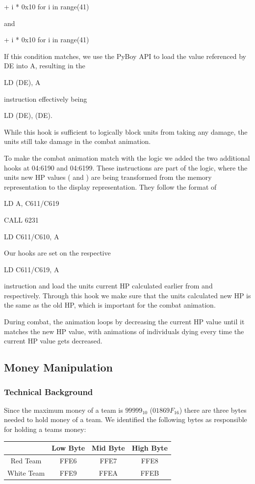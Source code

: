   + i *  0x10 for i in range(41)
 
 and

  + i *  0x10 for i in range(41)
 
If this condition matches, we use the PyBoy API to load the value referenced by DE into A, resulting in the

LD (DE), A

instruction effectively being 

LD (DE), (DE).

While this hook is sufficient to logically block units from taking any damage, the units still take damage in the combat animation.

To make the combat animation match with the logic we added the two additional hooks at 04:6190 and 04:6199.
These instructions are part of the logic, where the units new HP values ( and ) are being transformed from the memory representation to the display representation.
They follow the format of

LD A, C611/C619

CALL 6231

LD C611/C610, A

Our hooks are set on the respective

LD C611/C619, A

instruction and load the units current HP calculated earlier from  and  respectively.
Through this hook we make sure that the units calculated new HP is the same as the old HP, which is important for the combat animation.

During combat, the animation loops by decreasing the current HP value until it matches the new HP value, with animations of individuals dying every time the current HP value gets decreased.

\subsection{Money Manipulation}
\subsubsection{Technical Background}

Since the maximum money of a team is $99 999_{10}$ ($01869F_{16}$) there are three bytes needed to hold money of a team.
We identified the following bytes as responsible for holding a teams money:

\begin{tabular}{|c|c|c|c|}
	\hline
	& Low Byte & Mid Byte & High Byte \\
	\hline
	Red Team & FFE6 & FFE7 & FFE8 \\
	\hline
	White Team & FFE9 & FFEA & FFEB \\
	\hline
\end{tabular}


